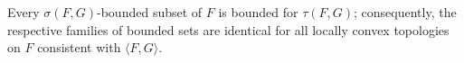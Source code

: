 Every $\sigma(F, G)$-bounded subset of $F$ is bounded for $\tau(F, G)$; consequently, the respective families of bounded sets are identical for all locally convex topologies on $F$ consistent with $\langle F, G \rangle$.
